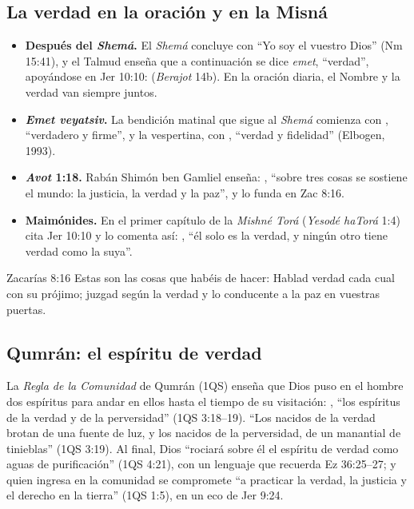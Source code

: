 \subsection{La verdad en la oración y en la Misná}
\begin{itemize}
\item \textbf{Después del \emph{Shemá}.} El \emph{Shemá} concluye con ``Yo soy el \SENOR{} vuestro Dios'' (Nm 15:41), y el Talmud enseña que a continuación se dice \emph{emet}, ``verdad'', apoyándose en Jer 10:10:  (\emph{Berajot} 14b). En la oración diaria, el Nombre y la verdad van siempre juntos.
\item \textbf{\emph{Emet veyatsiv}.} La bendición matinal que sigue al \emph{Shemá} comienza con , ``verdadero y firme'', y la vespertina, con , ``verdad y fidelidad'' (Elbogen, 1993).
\item \textbf{\emph{Avot} 1:18.} Rabán Shimón ben Gamliel enseña: , ``sobre tres cosas se sostiene el mundo: la justicia, la verdad y la paz'', y lo funda en Zac 8:16.
\item \textbf{Maimónides.} En el primer capítulo de la \emph{Mishné Torá} (\emph{Yesodé haTorá} 1:4) cita Jer 10:10 y lo comenta así: , ``él solo es la verdad, y ningún otro tiene verdad como la suya''.
\end{itemize}

\begin{verso}{Zacarías 8:16}
Estas son las cosas que habéis de hacer: Hablad verdad cada cual con su prójimo; juzgad según la verdad y lo conducente a la paz en vuestras puertas.
\end{verso}


\subsection{Qumrán: el espíritu de verdad}
La \emph{Regla de la Comunidad} de Qumrán (1QS) enseña que Dios puso en el hombre dos espíritus para andar en ellos hasta el tiempo de su visitación: , ``los espíritus de la verdad y de la perversidad'' (1QS 3:18--19). ``Los nacidos de la verdad brotan de una fuente de luz, y los nacidos de la perversidad, de un manantial de tinieblas'' (1QS 3:19). Al final, Dios ``rociará sobre él el espíritu de verdad como aguas de purificación'' (1QS 4:21), con un lenguaje que recuerda Ez 36:25--27; y quien ingresa en la comunidad se compromete ``a practicar la verdad, la justicia y el derecho en la tierra'' (1QS 1:5), en un eco de Jer 9:24.

